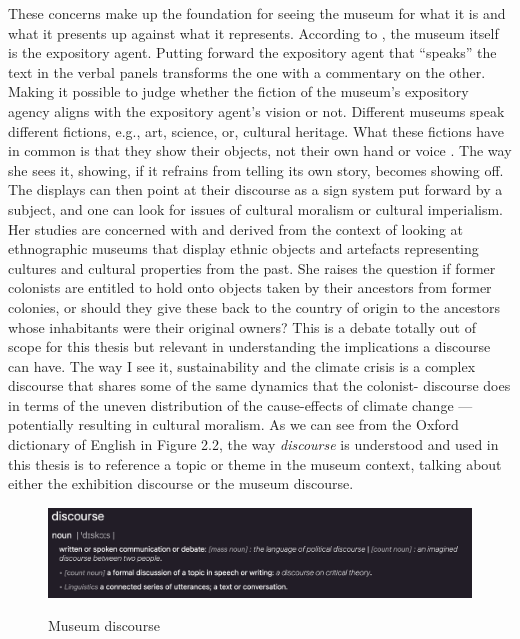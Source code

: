 These concerns make up the foundation for seeing the museum for what it is and what it presents up against what it represents. According to \autocite{Miekebal_book}, the museum itself is the expository agent. Putting forward the expository agent that “speaks” the text in the verbal panels transforms the one with a commentary on the other. Making it possible to judge whether the fiction of the museum's expository agency aligns with the expository agent's vision or not. Different museums speak different fictions, e.g., art, science, or, cultural heritage. What these fictions have in common is that they show their objects, not their own hand or voice \autocite{Miekebal_book}. The way she sees it, showing, if it refrains from telling its own story, becomes showing off. The displays can then point at their discourse as a sign system put forward by a subject, and one can look for issues of cultural moralism or cultural imperialism. Her studies are concerned with and derived from the context of looking at ethnographic museums that display ethnic objects and artefacts representing cultures and cultural properties from the past. She raises the question if former colonists are entitled to hold onto objects taken by their ancestors from former colonies, or should they give these back to the country of origin to the ancestors whose inhabitants were their original owners? This is a debate totally out of scope for this thesis but relevant in understanding the implications a discourse can have. The way I see it, sustainability and the climate crisis is a complex discourse that shares some of the same dynamics that the colonist- discourse does in terms of the uneven distribution of the cause-effects of climate change — potentially resulting in cultural moralism. As we can see from the Oxford dictionary of English in Figure 2.2, the way \emph{discourse} is understood and used in this thesis is to reference a topic or theme in the museum context, talking about either the exhibition discourse or the museum discourse.

\begin{figure}[H]
\centering
\includegraphics[width=12cm]{pictures/background/discourse.png}
\caption{Museum discourse}{\autocite{Oxford_dictionary}}
\end{figure}
 
